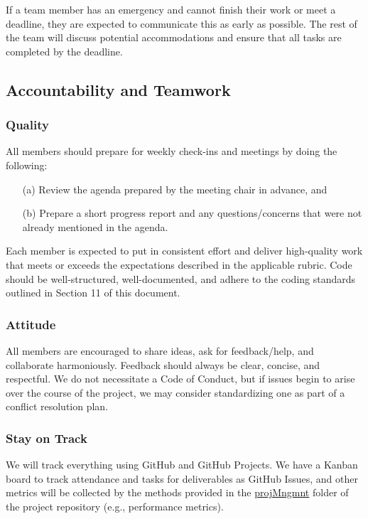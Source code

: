 \documentclass{article}
\begin{document}
If a team member has an emergency and cannot finish their work or meet a deadline,
they are expected to communicate this as early as possible. The rest of the team will
discuss potential accommodations and ensure that all tasks are completed by the
deadline.

\subsection*{Accountability and Teamwork}

\subsubsection*{Quality} 

All members should prepare for weekly check-ins and meetings by doing the following:

\begin{itemize}
  \item[(a)] Review the agenda prepared by the meeting chair in advance, and
  \item[(b)] Prepare a short progress report and any questions/concerns that were not
  already mentioned in the agenda.
\end{itemize}

Each member is expected to put in consistent effort and deliver high-quality work
that meets or exceeds the expectations described in the applicable rubric. Code
should be well-structured, well-documented, and adhere to the coding standards
outlined in Section 11 of this document.

\subsubsection*{Attitude}

All members are encouraged to share ideas, ask for feedback/help, and collaborate
harmoniously. Feedback should always be clear, concise, and respectful. We do not
necessitate a Code of Conduct, but if issues begin to arise over the course of the
project, we may consider standardizing one as part of a conflict resolution plan.

\subsubsection*{Stay on Track}

We will track everything using GitHub and GitHub Projects. We have a Kanban board to
track attendance and tasks for deliverables as GitHub Issues, and other
metrics will be collected by the methods provided in the \href{https://github.com/SumanyaG/Alkalytics/tree/main/docs/projMngmnt}{projMngmnt}
folder of the project repository (e.g., performance metrics).
\end{document}
